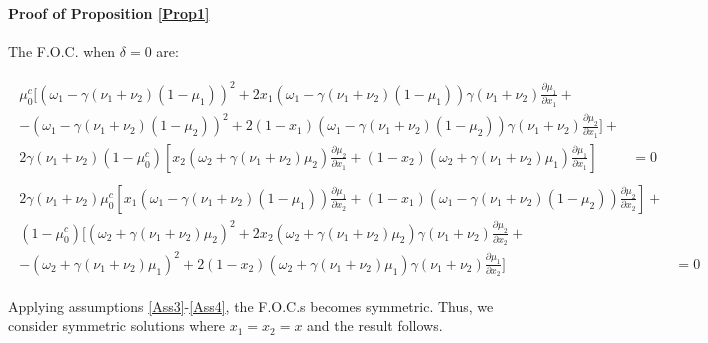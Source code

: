 \documentclass[12pt,a4paper]{article}
\begin{document}
\paragraph{Proof of Proposition \ref{Prop1}}
The F.O.C. when $\delta=0$ are:
\begin{small}
\begin{eqnarray}
\label{focx1gen2}
    \begin{split}
        \mu_0^c\Bigg[(\omega_1-\gamma(\nu_1+\nu_2)(1-\mu_1))^2+2x_1(\omega_1-\gamma(\nu_1+\nu_2)(1-\mu_1))\gamma(\nu_1+\nu_2)\frac{\partial \mu_1}{\partial x_1}+ & \\
        -(\omega_1-\gamma(\nu_1+\nu_2)(1-\mu_2))^2+2(1-x_1)(\omega_1-\gamma(\nu_1+\nu_2)(1-\mu_2))\gamma(\nu_1+\nu_2)\frac{\partial \mu_2}{\partial x_1}\Bigg]+ &\\
        2\gamma(\nu_1+\nu_2)(1-\mu_0^c)\left[x_2(\omega_2+\gamma(\nu_1+\nu_2)\mu_2)\frac{\partial \mu_2}{\partial x_1}+(1-x_2)(\omega_2+\gamma(\nu_1+\nu_2)\mu_1)\frac{\partial \mu_1}{\partial x_1}\right] & =0
    \end{split} \\ 
    \label{focx2gen2}
    \begin{split}
    2\gamma(\nu_1+\nu_2)\mu_0^c\left[x_1(\omega_1-\gamma(\nu_1+\nu_2)(1-\mu_1))\frac{\partial \mu_1}{\partial x_2}+(1-x_1)(\omega_1-\gamma(\nu_1+\nu_2)(1-\mu_2))\frac{\partial \mu_2}{\partial x_2}\right]+ &\\
    (1-\mu_0^c)\Bigg[(\omega_2+\gamma(\nu_1+\nu_2)\mu_2)^2+2x_2(\omega_2+\gamma(\nu_1+\nu_2)\mu_2)\gamma(\nu_1+\nu_2)\frac{\partial \mu_2}{\partial x_2}+ & \\
    -(\omega_2+\gamma(\nu_1+\nu_2)\mu_1)^2+2(1-x_2)(\omega_2+\gamma(\nu_1+\nu_2)\mu_1)\gamma(\nu_1+\nu_2)\frac{\partial \mu_1}{\partial x_2}\Bigg] & =0
    \end{split}
\end{eqnarray}
\end{small}
Applying assumptions \ref{Ass3}-\ref{Ass4}, the F.O.C.s becomes symmetric. Thus, we consider symmetric solutions where $x_1=x_2=x$ and the result follows.
\end{document}
